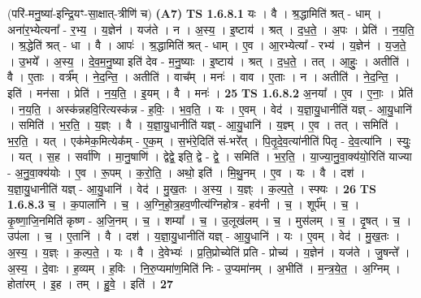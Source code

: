 \documentclass[17pt]{extarticle}
\begin{document}
                  \newline
                      (परि॑-मनु॒ष्या॑-इन्द्रि॒यꣳ-सा॒क्षात्-त्रीणि॑ च)  \textbf{(A7)} \newline \newline
                                \textbf{ TS 1.6.8.1} \newline
                  यः । वै । श्र॒द्धामिति॑ श्रत् - धाम् । अना॑र॒भ्येत्यना᳚ - र॒भ्य॒ । य॒ज्ञेन॑ । यज॑ते । न । अ॒स्य॒ । इ॒ष्टाय॑ । श्रत् । द॒ध॒ते॒ । अ॒पः । प्रेति॑ । न॒य॒ति॒ । श्र॒द्धेति॑ श्रत् - धा । वै । आपः॑ । श्र॒द्धामिति॑ श्रत् - धाम् । ए॒व । आ॒रभ्येत्या᳚ - रभ्य॑ । य॒ज्ञेन॑ । य॒ज॒ते॒ । उ॒भये᳚ । अ॒स्य॒ । दे॒व॒म॒नु॒ष्या इति॑ देव - म॒नु॒ष्याः । इ॒ष्टाय॑ । श्रत् । द॒ध॒ते॒ । तत् । आ॒हुः॒ । अतीति॑ । वै । ए॒ताः । वर्त्र᳚म् । ने॒द॒न्ति॒ । अतीति॑ । वाच᳚म् । मनः॑ । वाव । ए॒ताः । न । अतीति॑ । ने॒द॒न्ति॒ । इति॑ । मन॑सा । प्रेति॑ । न॒य॒ति॒ । इ॒यम् । वै । मनः॑ । \textbf{  25} \newline
                  \newline
                                \textbf{ TS 1.6.8.2} \newline
                  अ॒नया᳚ । ए॒व । ए॒नाः॒ । प्रेति॑ । न॒य॒ति॒ । अस्क॑न्नहवि॒रित्यस्क॑न्न - ह॒विः॒ । भ॒व॒ति॒ । यः । ए॒वम् । वेद॑ । य॒ज्ञा॒यु॒धानीति॑ यज्ञ् - आ॒यु॒धानि॑ । समिति॑ । भ॒र॒ति॒ । य॒ज्ञ्ः । वै । य॒ज्ञा॒यु॒धानीति॑ यज्ञ् - आ॒यु॒धानि॑ । य॒ज्ञ्म् । ए॒व । तत् । समिति॑ । भ॒र॒ति॒ । यत् । एक॑मेक॒मित्येक᳚म् - ए॒क॒म् । स॒भंरे॒दिति॑ सं-भरे᳚त् । पि॒तृ॒दे॒व॒त्या॑नीति॑ पितृ - दे॒व॒त्या॑नि । स्युः॒ । यत् । स॒ह । सर्वा॑णि । मा॒नु॒षाणि॑ । द्वेद्वे॒ इति॒ द्वे - द्वे॒ । समिति॑ । भ॒र॒ति॒ । या॒ज्या॒नु॒वा॒क्य॑यो॒रिति॑ याज्या - अ॒नु॒वा॒क्य॑योः । ए॒व । रू॒पम् । क॒रो॒ति॒ । अथो॒ इति॑ । मि॒थु॒नम् । ए॒व । यः । वै । दश॑ । य॒ज्ञा॒यु॒धानीति॑ यज्ञ् - आ॒यु॒धानि॑ । वेद॑ । मु॒ख॒तः । अ॒स्य॒ । य॒ज्ञ्ः । क॒ल्प॒ते॒ । स्फ्यः । \textbf{  26} \newline
                  \newline
                                \textbf{ TS 1.6.8.3} \newline
                  च॒ । क॒पाला॑नि । च॒ । अ॒ग्नि॒हो॒त्र॒हव॒णीत्य॑ग्निहोत्र - हव॑नी । च॒ । शूर्प᳚म् । च॒ । कृ॒ष्णा॒जि॒नमिति॑ कृष्ण - अ॒जि॒नम् । च॒ । शम्या᳚ । च॒ । उ॒लूख॑लम् । च॒ । मुस॑लम् । च॒ । दृ॒षत् । च॒ । उप॑ला । च॒ । ए॒तानि॑ । वै । दश॑ । य॒ज्ञा॒यु॒धानीति॑ यज्ञ् - आ॒यु॒धानि॑ । यः । ए॒वम् । वेद॑ । मु॒ख॒तः । अ॒स्य॒ । य॒ज्ञ्ः । क॒ल्प॒ते॒ । यः । वै । दे॒वेभ्यः॑ । प्र॒ति॒प्रोच्येति॑ प्रति - प्रोच्य॑ । य॒ज्ञेन॑ । यज॑ते । जु॒षन्ते᳚ । अ॒स्य॒ । दे॒वाः । ह॒व्यम् । ह॒विः । नि॒रु॒प्यमा॑ण॒मिति॑ निः - उ॒प्यमा॑नम् । अ॒भीति॑ । म॒न्त्र॒ये॒त॒ । अ॒ग्निम् । होता॑रम् । इ॒ह । तम् । हु॒वे॒ । इति॑ । \textbf{  27} \newline
\end{document}
